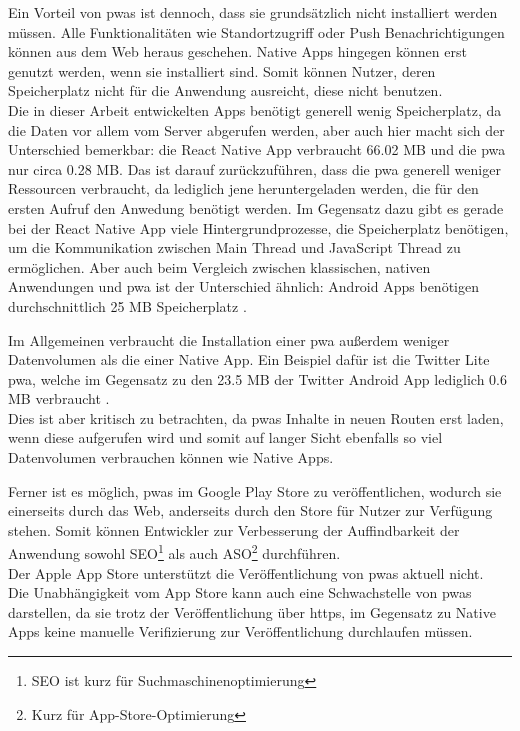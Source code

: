 Ein Vorteil von \acp{pwa} ist dennoch, dass sie grundsätzlich nicht installiert werden müssen.
Alle Funktionalitäten wie Standortzugriff oder Push Benachrichtigungen können aus dem Web heraus geschehen.
Native Apps hingegen können erst genutzt werden, wenn sie installiert sind.
Somit können Nutzer, deren Speicherplatz nicht für die Anwendung ausreicht, diese nicht benutzen.\\
Die in dieser Arbeit entwickelten Apps benötigt generell wenig Speicherplatz, da die Daten vor allem vom Server abgerufen werden, aber auch hier macht sich der Unterschied bemerkbar: die React Native App verbraucht 66.02 MB und die \ac{pwa} nur circa 0.28 MB.
Das ist darauf zurückzuführen, dass die \ac{pwa} generell weniger Ressourcen verbraucht, da lediglich jene heruntergeladen werden, die für den ersten Aufruf den Anwedung benötigt werden.
Im Gegensatz dazu gibt es gerade bei der React Native App viele Hintergrundprozesse, die Speicherplatz benötigen, um die Kommunikation zwischen Main Thread und JavaScript Thread zu ermöglichen.
Aber auch beim Vergleich zwischen klassischen, nativen Anwendungen und \ac{pwa} ist der Unterschied ähnlich: Android Apps benötigen durchschnittlich 25 MB Speicherplatz \cite{Bijlani.2021}.

Im Allgemeinen verbraucht die Installation einer \ac{pwa} außerdem weniger Datenvolumen als die einer Native App.
Ein Beispiel dafür ist die Twitter Lite \ac{pwa}, welche im Gegensatz zu den 23.5 MB der Twitter Android App lediglich 0.6 MB verbraucht \cite{Google.o.J.}.\\
Dies ist aber kritisch zu betrachten, da \acp{pwa} Inhalte in neuen Routen erst laden, wenn diese aufgerufen wird und somit auf langer Sicht ebenfalls so viel Datenvolumen verbrauchen können wie Native Apps.

Ferner ist es möglich, \acp{pwa} im Google Play Store zu veröffentlichen, wodurch sie einerseits durch das Web, anderseits durch den Store für Nutzer zur Verfügung stehen.
Somit können Entwickler zur Verbesserung der Auffindbarkeit der Anwendung sowohl SEO\footnote{SEO ist kurz für Suchmaschinenoptimierung} als auch ASO\footnote{Kurz für App-Store-Optimierung} durchführen.\\
Der Apple App Store unterstützt die Veröffentlichung von \acp{pwa} aktuell nicht.\\
Die Unabhängigkeit vom App Store kann auch eine Schwachstelle von \acp{pwa} darstellen, da sie trotz der Veröffentlichung über \ac{https}, im Gegensatz zu Native Apps keine manuelle Verifizierung zur Veröffentlichung durchlaufen müssen.

